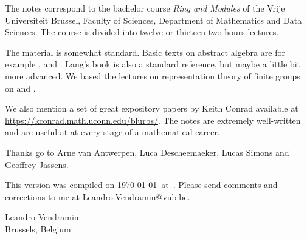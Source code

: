 \preface

The notes correspond to the bachelor 
course \emph{Ring and Modules} of the 
Vrije Universiteit Brussel, 
Faculty of Sciences, 
Department of Mathematics and Data Sciences. The course
is divided into twelve or thirteen two-hours lectures. 

The material is somewhat standard. Basic texts on abstract algebra
are for example \cite{MR1129886}, \cite{MR2286236} and \cite{MR600654}. 
Lang's book \cite{MR783636} is also a standard reference, but 
maybe a little bit more advanced. 
We based the lectures on representation theory of finite
groups on \cite{MR0450380} and 
\cite{MR2867444}. 

We also mention a set of great expository papers by 
Keith Conrad available at 
\url{https://kconrad.math.uconn.edu/blurbs/}. 
The notes are extremely well-written and are useful at  
at every stage of a mathematical career. 
 
Thanks go to Arne van Antwerpen, Luca Descheemaeker, Lucas Simons
and Geoffrey Jassens. 

This version 
was compiled on \today~at~\currenttime. 
Please send comments and corrections to me at \url{Leandro.Vendramin@vub.be}. 


\bigskip
\begin{flushright}
Leandro Vendramin\\Brussels, Belgium\par
\end{flushright}
